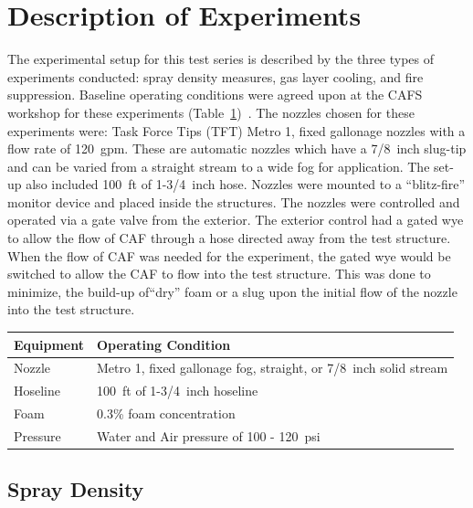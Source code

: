 \documentclass[12pt,oneside]{book}
\begin{document}
\section{Description of Experiments}
\label{sec:desc_experiments}
The experimental setup for this test series is described by the three types of experiments conducted: spray density measures, gas layer cooling, and fire suppression.  Baseline operating conditions were agreed upon at the CAFS workshop for these experiments (Table~\ref{tab:op_condition})~\cite{Grant:2011}. The nozzles chosen for these experiments were: Task Force Tips (TFT) Metro 1, fixed gallonage nozzles with a flow rate of 120~gpm. These are automatic nozzles which have a 7/8~inch slug-tip and can be varied from a straight stream to a wide fog for application. The set-up also included 100~ft of 1-3/4~inch hose. Nozzles were mounted to a ``blitz-fire'' monitor device and placed inside the structures. The nozzles were controlled and operated via a gate valve from the exterior. The exterior control had a gated wye to allow the flow of CAF through a hose directed away from the test structure. When the flow of CAF was needed for the experiment, the gated wye would be switched to allow the CAF to flow into the test structure. This was done to minimize, the build-up of``dry'' foam or a slug upon the initial flow of the nozzle into the test structure.

\begin{table}[!ht]
\centering
{}\label{tab:op_condition}
\begin{tabular}{ll}
\toprule[1.5pt]
Equipment    &   Operating Condition \\
\midrule
Nozzle       & Metro 1, fixed gallonage fog, straight, or 7/8~inch solid stream \\
Hoseline     & 100~ft of 1-3/4~inch hoseline \\
Foam         & 0.3\% foam concentration \\
Pressure     & Water and Air pressure of 100 - 120~psi \\
\bottomrule[1.25pt]
\end{tabular}\par
\end{table}


\subsection{Spray Density}
\label{sec:desc_Spray_Density}
\end{document}
